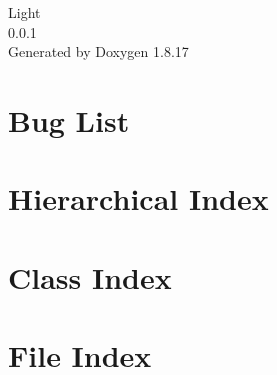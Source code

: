 \let\mypdfximage\pdfximage\def\pdfximage{\immediate\mypdfximage}\documentclass[twoside]{book}
\newcommand{\+}{\discretionary{\mbox{\scriptsize$\hookleftarrow$}}{}{}}
\newcommand{\clearemptydoublepage}{%
  \newpage{\pagestyle{empty}\cleardoublepage}%
}
\begin{document}
\hypersetup{pageanchor=false,
             bookmarksnumbered=true,
             pdfencoding=unicode
            }
\begin{titlepage}
\vspace*{7cm}
\begin{center}%
{\Large Light \\[1ex]\large 0.\+0.\+1 }\\
\vspace*{1cm}
{\large Generated by Doxygen 1.8.17}\\
\end{center}
\end{titlepage}
\clearemptydoublepage
{}
\tableofcontents
\clearemptydoublepage
{}
\hypersetup{pageanchor=true}

\chapter{Bug List}
\label{bug}

\chapter{Hierarchical Index}

\chapter{Class Index}

\chapter{File Index}

\end{document}
